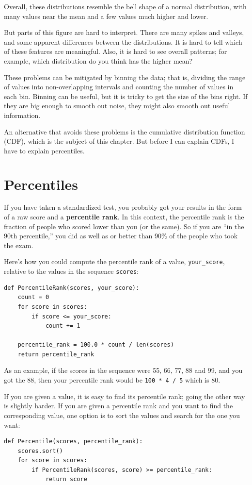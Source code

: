 \documentclass[12pt]{book}
\begin{document}
Overall, these distributions resemble the bell shape of a normal
distribution, with many values near the mean and a few values much
higher and lower.

But parts of this figure are hard to interpret.  There are many spikes
and valleys, and some apparent differences between the distributions.
It is hard to tell which of these features are meaningful.  Also, it
is hard to see overall patterns; for example, which distribution do
you think has the higher mean?

These problems can be mitigated by binning the data; that is, dividing
the range of values into non-overlapping intervals and counting the
number of values in each bin.  Binning can be useful, but it is tricky
to get the size of the bins right.  If they are big enough to smooth
out noise, they might also smooth out useful information.

An alternative that avoids these problems is the cumulative
distribution function (CDF), which is the subject of this chapter.
But before I can explain CDFs, I have to explain percentiles.


\section{Percentiles}

If you have taken a standardized test, you probably got your
results in the form of a raw score and a {\bf percentile rank}.
In this context, the percentile rank is the fraction of people who
scored lower than you (or the same).  So if you are ``in the 90th
percentile,'' you did as well as or better than 90\% of the people who
took the exam.

Here's how you could compute the percentile rank of a value,
\verb"your_score", relative to the values in the sequence \verb"scores":
%
\begin{verbatim}
def PercentileRank(scores, your_score):
    count = 0
    for score in scores:
        if score <= your_score:
            count += 1

    percentile_rank = 100.0 * count / len(scores)
    return percentile_rank
\end{verbatim}

As an example, if the
scores in the sequence were 55, 66, 77, 88 and 99, and you got the 88,
then your percentile rank would be \verb"100 * 4 / 5" which is 80.

If you are given a value, it is easy to find its percentile rank; going
the other way is slightly harder.  If you are given a percentile rank
and you want to find the corresponding value, one option is to
sort the values and search for the one you want:
%
\begin{verbatim}
def Percentile(scores, percentile_rank):
    scores.sort()
    for score in scores:
        if PercentileRank(scores, score) >= percentile_rank:
            return score
\end{verbatim}
\end{document}
